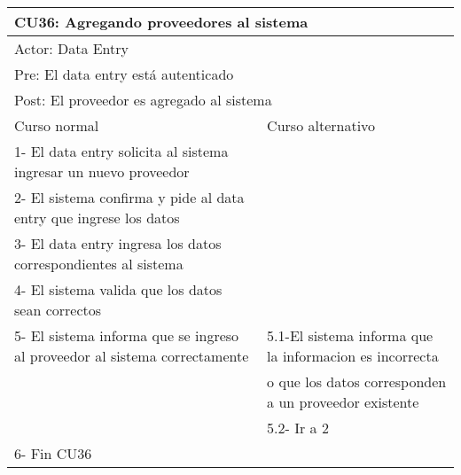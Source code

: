 \begin{table}[H]
  \begin{adjustbox}{max width = \textwidth}
  \begin{tabular}{|l|l|}
    \hline
    \multicolumn{2}{|l|}{CU36: Agregando proveedores al sistema} \\\hline
    \multicolumn{2}{|l|}{Actor: Data Entry} \\\hline
    \multicolumn{2}{|l|}{Pre: El data entry está autenticado} \\\hline
    \multicolumn{2}{|l|}{Post: El proveedor es agregado al sistema} \\\hline
     Curso normal & Curso alternativo\\ \hline
	 1- El data entry solicita al sistema ingresar un nuevo proveedor & \\ \hline
     2- El sistema confirma y pide al data entry que ingrese los datos & \\ \hline
     3- El data entry ingresa los datos correspondientes al sistema & \\ \hline
     4- El sistema valida que los datos sean correctos & \\ \hline
     5- El sistema informa que se ingreso al proveedor al sistema correctamente & 5.1-El sistema informa que la informacion es incorrecta \\ & o que los datos corresponden a un proveedor existente  \\ & 5.2- Ir a 2 \\ \hline
     6- Fin CU36 & \\ \hline
  \end{tabular}
  \end{adjustbox}
\end{table}




